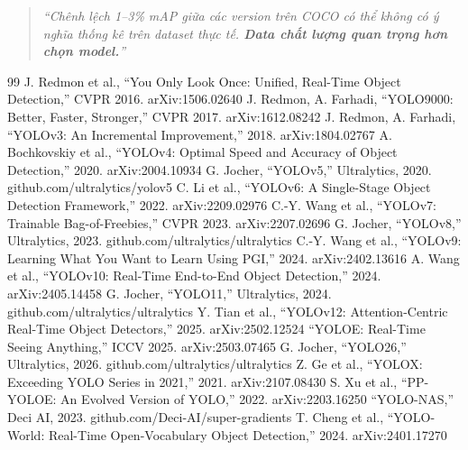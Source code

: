 \documentclass[12pt,a4paper]{report}
\begin{document}
\begin{quote}
\textit{``Chênh lệch 1--3\% mAP giữa các version trên COCO có thể không có ý nghĩa thống kê trên dataset thực tế. \textbf{Data chất lượng quan trọng hơn chọn model.}''}
\end{quote}



\vspace{0.5cm}

\begin{thebibliography}{99}
 J. Redmon et al., ``You Only Look Once: Unified, Real-Time Object Detection,'' CVPR 2016. arXiv:1506.02640
 J. Redmon, A. Farhadi, ``YOLO9000: Better, Faster, Stronger,'' CVPR 2017. arXiv:1612.08242
 J. Redmon, A. Farhadi, ``YOLOv3: An Incremental Improvement,'' 2018. arXiv:1804.02767
 A. Bochkovskiy et al., ``YOLOv4: Optimal Speed and Accuracy of Object Detection,'' 2020. arXiv:2004.10934
 G. Jocher, ``YOLOv5,'' Ultralytics, 2020. github.com/ultralytics/yolov5
 C. Li et al., ``YOLOv6: A Single-Stage Object Detection Framework,'' 2022. arXiv:2209.02976
 C.-Y. Wang et al., ``YOLOv7: Trainable Bag-of-Freebies,'' CVPR 2023. arXiv:2207.02696
 G. Jocher, ``YOLOv8,'' Ultralytics, 2023. github.com/ultralytics/ultralytics
 C.-Y. Wang et al., ``YOLOv9: Learning What You Want to Learn Using PGI,'' 2024. arXiv:2402.13616
 A. Wang et al., ``YOLOv10: Real-Time End-to-End Object Detection,'' 2024. arXiv:2405.14458
 G. Jocher, ``YOLO11,'' Ultralytics, 2024. github.com/ultralytics/ultralytics
 Y. Tian et al., ``YOLOv12: Attention-Centric Real-Time Object Detectors,'' 2025. arXiv:2502.12524
 ``YOLOE: Real-Time Seeing Anything,'' ICCV 2025. arXiv:2503.07465
 G. Jocher, ``YOLO26,'' Ultralytics, 2026. github.com/ultralytics/ultralytics
 Z. Ge et al., ``YOLOX: Exceeding YOLO Series in 2021,'' 2021. arXiv:2107.08430
 S. Xu et al., ``PP-YOLOE: An Evolved Version of YOLO,'' 2022. arXiv:2203.16250
 ``YOLO-NAS,'' Deci AI, 2023. github.com/Deci-AI/super-gradients
 T. Cheng et al., ``YOLO-World: Real-Time Open-Vocabulary Object Detection,'' 2024. arXiv:2401.17270
\end{thebibliography}

\end{document}
